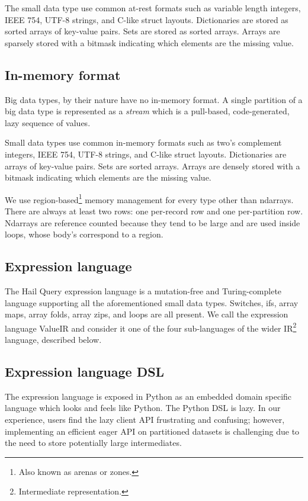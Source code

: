 \documentclass[sigconf, nonacm]{acmart}
\begin{document}
The small data type use common at-rest formats such as variable length integers, IEEE 754, UTF-8
strings, and C-like struct layouts. Dictionaries are stored as sorted arrays of key-value
pairs. Sets are stored as sorted arrays. Arrays are sparsely stored with a bitmask indicating which
elements are the missing value.

\subsection{In-memory format}

Big data types, by their nature have no in-memory format. A single partition of a big data type is
represented as a \emph{stream} which is a pull-based, code-generated, lazy sequence of values.

Small data types use common in-memory formats such as two's complement integers, IEEE 754, UTF-8
strings, and C-like struct layouts. Dictionaries are arrays of key-value pairs. Sets are sorted
arrays. Arrays are densely stored with a bitmask indicating which elements are the missing value.

We use region-based\footnote{Also known as arenas or zones.} memory management for every type other
than ndarrays. There are always at least two rows: one per-record row and one per-partition
row. Ndarrays are reference counted because they tend to be large and are used inside loops, whose
body's correspond to a region.

\subsection{Expression language}

The Hail Query expression language is a mutation-free and Turing-complete language supporting all
the aforementioned small data types. Switches, ifs, array maps, array folds, array zips, and loops
are all present. We call the expression language ValueIR and consider it one of the four
sub-languages of the wider IR\footnote{Intermediate representation.} language, described below.

\subsection{Expression language DSL}

The expression language is exposed in Python as an embedded domain specific language which looks and
feels like Python. The Python DSL is lazy. In our experience, users find the lazy client API
frustrating and confusing; however, implementing an efficient eager API on partitioned datasets is
challenging due to the need to store potentially large intermediates.
\end{document}
